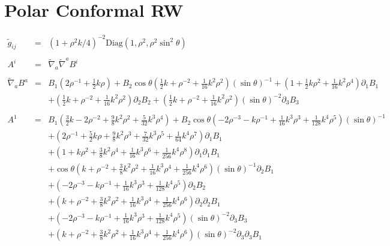 \documentclass[10pt,letterpaper]{article}
\numberwithin{equation}{section}
\begin{document}
\section{Polar Conformal RW}
\begin{eqnarray}
\tilde g_{ij} &=& (1+\rho^2 k/4)^{-2}\text{Diag}\left(1,\rho ^2,\rho ^2\sin^2\theta\right)
\\ \nonumber\\
A^i &=& \tilde\nabla_a\tilde\nabla^a B^i
\\ \nonumber\\
\tilde\nabla_a B^a &=&  B_{1} (2 \rho^{-1} + \tfrac{1}{2} k \rho) + B_{2} \cos\theta (\tfrac{1}{2} k + \rho^{-2} + \tfrac{1}{16} k^2 \rho^2) (\sin\theta)^{-1} + (1 + \tfrac{1}{2} k \rho^2 + \tfrac{1}{16} k^2 \rho^4) \partial_{1}B_{1} \nonumber \\ 
&& + (\tfrac{1}{2} k + \rho^{-2} + \tfrac{1}{16} k^2 \rho^2) \partial_{2}B_{2} + (\tfrac{1}{2} k + \rho^{-2} + \tfrac{1}{16} k^2 \rho^2) (\sin\theta)^{-2} \partial_{3}B_{3}
\\ \nonumber\\
A^{1}&=& B_{1} (\tfrac{3}{2} k - 2 \rho^{-2} + \tfrac{9}{8} k^2 \rho^2 + \tfrac{5}{32} k^3 \rho^4) + B_{2} \cos\theta (-2 \rho^{-3} -  k \rho^{-1} + \tfrac{1}{16} k^3 \rho^3 + \tfrac{1}{128} k^4 \rho^5) (\sin\theta)^{-1} \nonumber \\ 
&& + (2 \rho^{-1} + \tfrac{5}{2} k \rho + \tfrac{9}{8} k^2 \rho^3 + \tfrac{7}{32} k^3 \rho^5 + \tfrac{1}{64} k^4 \rho^7) \partial_{1}B_{1} \nonumber \\ 
&& + (1 + k \rho^2 + \tfrac{3}{8} k^2 \rho^4 + \tfrac{1}{16} k^3 \rho^6 + \tfrac{1}{256} k^4 \rho^8) \partial_{1}\partial_{1}B_{1} \nonumber \\ 
&& + \cos\theta (k + \rho^{-2} + \tfrac{3}{8} k^2 \rho^2 + \tfrac{1}{16} k^3 \rho^4 + \tfrac{1}{256} k^4 \rho^6) (\sin\theta)^{-1} \partial_{2}B_{1} \nonumber \\ 
&& + (-2 \rho^{-3} -  k \rho^{-1} + \tfrac{1}{16} k^3 \rho^3 + \tfrac{1}{128} k^4 \rho^5) \partial_{2}B_{2} \nonumber \\ 
&& + (k + \rho^{-2} + \tfrac{3}{8} k^2 \rho^2 + \tfrac{1}{16} k^3 \rho^4 + \tfrac{1}{256} k^4 \rho^6) \partial_{2}\partial_{2}B_{1} \nonumber \\ 
&& + (-2 \rho^{-3} -  k \rho^{-1} + \tfrac{1}{16} k^3 \rho^3 + \tfrac{1}{128} k^4 \rho^5) (\sin\theta)^{-2} \partial_{3}B_{3} \nonumber \\ 
&& + (k + \rho^{-2} + \tfrac{3}{8} k^2 \rho^2 + \tfrac{1}{16} k^3 \rho^4 + \tfrac{1}{256} k^4 \rho^6) (\sin\theta)^{-2} \partial_{3}\partial_{3}B_{1}

\end{eqnarray}
\end{document}
